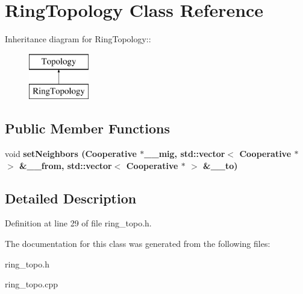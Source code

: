 \section{Ring\-Topology Class Reference}
\label{class_ring_topology}
Inheritance diagram for Ring\-Topology::\begin{figure}[H]
\begin{center}
\leavevmode
\includegraphics[height=2cm]{class_ring_topology}
\end{center}
\end{figure}
\subsection*{Public Member Functions}
\begin{CompactItemize}
\item 
void \bf{set\-Neighbors} (\bf{Cooperative} $\ast$\_\-\_\-mig, std::vector$<$ \bf{Cooperative} $\ast$ $>$ \&\_\-\_\-from, std::vector$<$ \bf{Cooperative} $\ast$ $>$ \&\_\-\_\-to)\label{class_ring_topology_292a7746993788f96042f2f628cfcbc5}

\end{CompactItemize}


\subsection{Detailed Description}




Definition at line 29 of file ring\_\-topo.h.

The documentation for this class was generated from the following files:\begin{CompactItemize}
\item 
ring\_\-topo.h\item 
ring\_\-topo.cpp\end{CompactItemize}
